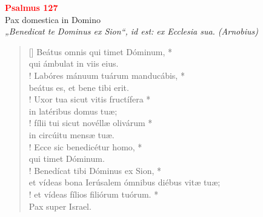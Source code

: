 


\def\greinitialformat#1{%
{\fontsize{39}{39}\selectfont #1}%
}




\vspace{0.3cm}
\begin{center}
 \textcolor{red}{\large \bf Psalmus 127}\\
Pax domestica in Domino\\
\textit{\small „Benedicat te Dominus ex Sion“, id est: ex Ecclesia sua. (Arnobius)}
\end{center}
\begin{verse}[\versewidth]
Beátus omnis qui timet Dóminum, *\\
qui ámbulat in viis eius.\\!
\vin Labóres mánuum tuárum manducábis, *\\
\vin beátus es, et bene tibi erit.\\!
Uxor tua sicut vitis fructífera *\\
in latéribus domus tuæ;\\!
\vin fílii tui sicut novéllæ olivárum *\\
\vin in circúitu mensæ tuæ.\\!
Ecce sic benedicétur homo, *\\
qui timet Dóminum.\\!
\vin Benedícat tibi Dóminus ex Sion, *\\
\vin et vídeas bona Ierúsalem ómnibus diébus vitæ tuæ;\\!
et vídeas fílios filiórum tuórum. *\\
Pax super Israel.\\
\end{verse}
\vspace{1cm}


